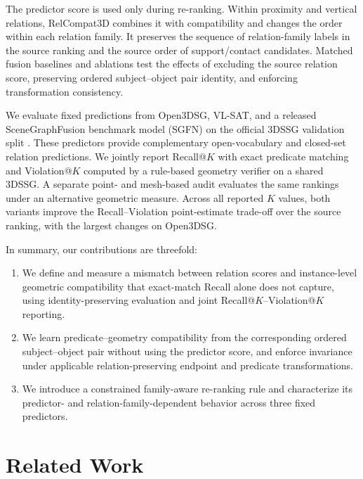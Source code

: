 \documentclass[letterpaper]{article}
\begin{document}
The predictor score is used only during re-ranking. Within proximity and vertical relations, RelCompat3D combines it with compatibility and changes the order within each relation family. It preserves the sequence of relation-family labels in the source ranking and the source order of support/contact candidates. Matched fusion baselines and ablations test the effects of excluding the source relation score, preserving ordered subject--object pair identity, and enforcing transformation consistency.

We evaluate fixed predictions from Open3DSG, VL-SAT, and a released SceneGraphFusion benchmark model (SGFN) on the official 3DSSG validation split \cite{wang2023vl,koch2024open3dsg,wu2021scenegraphfusion}. These predictors provide complementary open-vocabulary and closed-set relation predictions. We jointly report Recall@$K$ with exact predicate matching and Violation@$K$ computed by a rule-based geometry verifier on a shared 3DSSG. A separate point- and mesh-based audit evaluates the same rankings under an alternative geometric measure. Across all reported $K$ values, both variants improve the Recall--Violation point-estimate trade-off over the source ranking, with the largest changes on Open3DSG.

In summary, our contributions are threefold:
\begin{enumerate}
    \item We define and measure a mismatch between relation scores and instance-level geometric compatibility that exact-match Recall alone does not capture, using identity-preserving evaluation and joint Recall@$K$--Violation@$K$ reporting.
    \item We learn predicate--geometry compatibility from the corresponding ordered subject--object pair without using the predictor score, and enforce invariance under applicable relation-preserving endpoint and predicate transformations.
    \item We introduce a constrained family-aware re-ranking rule and characterize its predictor- and relation-family-dependent behavior across three fixed predictors.
\end{enumerate}

\section{Related Work}
\end{document}
